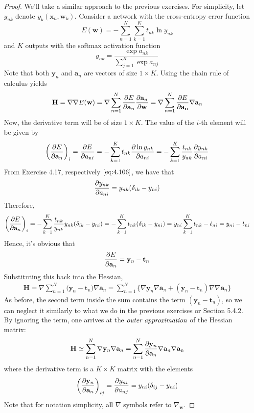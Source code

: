 \vspace{1em}

\begin{proof}
    We'll take a similar approach to the previous exercises. For simplicity,
    let $y_{nk}$ denote $y_{k}(\mathbf{x}_n, \mathbf{w}_k)$. 
    Consider a network with the cross-entropy error function
    \[
        E(\mathbf{w}) = -\sum_{n=1}^{N} \sum_{k=1}^{K} t_{nk} \ln y_{nk}  
    \] 
    and $K$ outputs with the softmax activation function
     \[
         y_{nk} = \frac{\exp{a_{nk}}}{\sum_{j=1}^{K} \exp{a_{nj}}} 
    \] 
    Note that both $\mathbf{y}_n$ and $\mathbf{a}_n$ are vectors 
    of size $1 \times K$. Using the chain rule of calculus yields
    \[
        \mathbf{H} 
        = \nabla \nabla E(\mathbf{w})
        = \nabla \sum_{n=1}^{N} \pdv{E}{\mathbf{a}_n} \pdv{\mathbf{a}_n}{\mathbf{w}}
        = \nabla \sum_{n=1}^{N} \pdv{E}{\mathbf{a_n}} \nabla \mathbf{a}_n 
    \] 
    Now, the derivative term will be of size $1 \times K$. The value of the $i$-th element
    will be given by
    \begin{align*}
        \bigg(\pdv{E}{\mathbf{a}_n}\bigg)_i
        = \pdv{E}{a_{ni}}
        = -\sum_{k=1}^{K} t_{nk} \pdv{\ln y_{nk}}{a_{ni}}
        = -\sum_{k=1}^{K} \frac{t_{nk}}{y_{nk}} \pdv{y_{nk}}{a_{ni}}
    \end{align*}
    From Exercise 4.17, respectively $\eqref{eq:4.106}$, we have that
     \[
         \pdv{y_{nk}}{a_{ni}} = y_{nk}(\delta_{ik} - y_{ni})
    \] 
    Therefore,
    \[
        \bigg(\pdv{E}{\mathbf{a}_n}\bigg)_i
        = -\sum_{k=1}^{K} \frac{t_{nk}}{y_{nk}} y_{nk} (\delta_{ik} - y_{ni})
        = -\sum_{k=1}^{K} t_{nk} (\delta_{ik} - y_{ni})
        = y_{ni} \sum_{k=1}^{K} t_{nk} - t_{ni}
        = y_{ni} - t_{ni}
    \] 
    Hence, it's obvious that
    \[
        \pdv{E}{\mathbf{a}_n} = \mathbf{y}_n - \mathbf{t}_n
    \] 
    Substituting this back into the Hessian,
    \begin{align*}
        \mathbf{H} 
        = \nabla \sum_{n=1}^{N} \big(\mathbf{y}_n - \mathbf{t}_n\big) \nabla \mathbf{a}_n
        = \sum_{n=1}^{N} \big\{\nabla \mathbf{y}_n \nabla \mathbf{a}_n 
            + (\mathbf{y}_n - \mathbf{t}_n) \nabla \nabla \mathbf{a}_n\}
    \end{align*}
    As before, the second term inside the sum contains the term $(\mathbf{y}_n - \mathbf{t}_n)$,
    so we can neglect it similarly to what we do in the previous exercises or Section 5.4.2. By ignoring
    the term, one arrives at the $\emph{outer approximation}$ of the Hessian matrix:
    \[
        \mathbf{H} \simeq 
        \sum_{n=1}^{N} \nabla \mathbf{y}_n \nabla \mathbf{a}_n
        = \sum_{n=1}^{N} \pdv{\mathbf{y}_n}{\mathbf{a}_n} \nabla \mathbf{a}_n \nabla \mathbf{a}_n
    \] 
    where the derivative term is a $K \times K$ matrix with the elements
    \[
        \bigg(\pdv{\mathbf{y}_n}{\mathbf{a}_n}\bigg)_{ij}
        = \pdv{y_{ni}}{a_{nj}}
        = y_{ni} (\delta_{ij} - y_{ni})
    \] 
    Note that for notation simplicity, all $\nabla$ symbols refer to $\nabla_\mathbf{w}$.
\end{proof}

